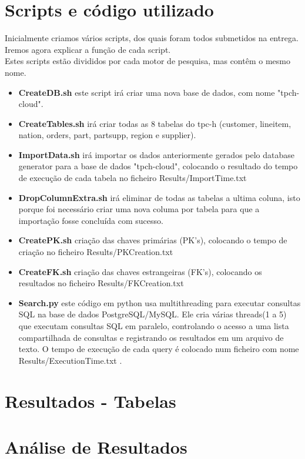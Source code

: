\documentclass{article}
\begin{document}
\section{Scripts e código utilizado}
\quad Inicialmente criamos vários scripts, dos quais foram todos submetidos na entrega. Iremos agora explicar a função de cada script.\\

\quad Estes scripts estão divididos por cada motor de pesquisa, mas contêm o mesmo nome.\\

\begin{itemize}
    \item \textbf{CreateDB.sh} este script irá criar uma nova base de dados, com nome "tpch-cloud".
    \item \textbf{CreateTables.sh} irá criar todas as 8 tabelas do tpc-h (customer, lineitem, nation, orders, part, partsupp, region e supplier).
    \item \textbf{ImportData.sh} irá importar os dados anteriormente gerados pelo database generator para a base de dados "tpch-cloud", colocando o resultado do tempo de execução de cada tabela no ficheiro Results/ImportTime.txt
    \item \textbf{DropColumnExtra.sh} irá eliminar de todas as tabelas a ultima coluna, isto porque foi necessário criar uma nova columa por tabela para que a importação fosse concluída com sucesso.
    \item \textbf{CreatePK.sh} criação das chaves primárias (PK's), colocando o tempo de criação no ficheiro Results/PKCreation.txt
    \item \textbf{CreateFK.sh} criação das chaves estrangeiras (FK's), colocando os resultados no ficheiro Results/FKCreation.txt
    \item \textbf{Search.py} este código em python usa multithreading para executar consultas SQL na base de dados PostgreSQL/MySQL. Ele cria várias threads(1 a 5) que executam consultas SQL em paralelo, controlando o acesso a uma lista compartilhada de consultas e registrando os resultados em um arquivo de texto. O tempo de execução de cada query é colocado num ficheiro com nome Results/ExecutionTime.txt .
     
\end{itemize}


\section{Resultados - Tabelas}


\section{Análise de Resultados}
\end{document}
